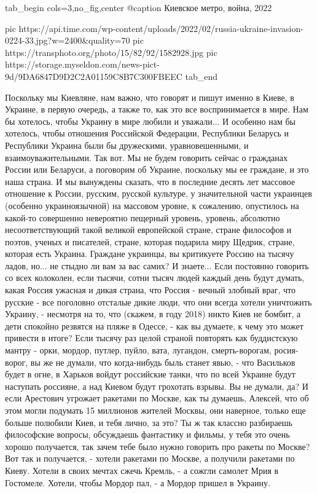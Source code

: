 \ifcmt
  tab_begin cols=3,no_fig,center
		 @caption Киевское метро, война, 2022

		 pic https://api.time.com/wp-content/uploads/2022/02/russia-ukraine-invasion-0224-33.jpg?w=2400&quality=70
		 pic https://transphoto.org/photo/15/82/92/1582928.jpg
		 pic https://storage.myseldon.com/news-pict-9d/9DA6847D9D2C2A01159C8B7C300FBEEC
  tab_end
\fi

Поскольку мы Киевляне, нам важно, что говорят и пишут именно в Киеве, в
Украине, в первую очередь, а также то, как это все воспринимается в мире. Нам
бы хотелось, чтобы Украину в мире любили и уважали... И особенно нам бы
хотелось, чтобы отношения Российской Федерации, Республики Беларусь и
Республики Украина были бы дружескими, уравновешенными, и взаимоуважительными.
Так вот. Мы не будем говорить сейчас о гражданах России или Беларуси, а
поговорим об Украине, поскольку мы ее граждане, и это наша страна. И мы вынуждены сказать, что в
последние десять лет массовое отношение к России, русским, русской культуре, у
значительной части украинцев (особенно украиноязычной) на массовом уровне, к
сожалению, опустилось на какой-то совершенно невероятно пещерный уровень, уровень,
абсолютно несоответствующий такой великой европейской стране, стране философов
и поэтов, ученых и писателей, стране, которая подарила миру Щедрик, стране,
которая есть Украина. Граждане украинцы, вы критикуете Россию на тысячу ладов,
но... не стыдно ли вам за вас самих? И знаете...  Если постоянно говорить со
всех колоколен, если тысячи, сотни тысяч людей каждый день будут думать, какая
Россия ужасная и дикая страна, что Россия - вечный злобный враг, что русские -
все поголовно отсталые дикие люди, что они всегда хотели уничтожить Украину, -
несмотря на то, что (скажем, в году 2018) никто Киев не бомбит, а дети спокойно
резвятся на пляже в Одессе, - как вы думаете, к чему это может привести в
итоге? Если тысячу раз целой страной повторять как буддистскую мантру - орки,
мордор, путлер, пуйло, вата, лугандон, смерть-ворогам, росия-ворог, вы же не
думали, что когда-нибудь быль станет явью, - что Васильков будет в огне, в
Харьков войдут российские танки, что по всей Украине будут наступать россияне,
а над Киевом будут грохотать взрывы. Вы не думали, да? И если Арестович
угрожает ракетами по Москве, как ты думаешь, Алексей, что об этом могли
подумать 15 миллионов жителей Москвы, они наверное, только еще больше полюбили
Киев, и тебя лично, за это? Ты ж так классно разбираешь философские вопросы,
обсуждаешь фантастику и фильмы, у тебя это очень хорошо получается, так зачем
тебе было нужно говорить про ракеты по Москве? Вот так и получается, - хотели
ракетами по Москве, а получили ракетами по Киеву. Хотели в своих мечтах сжечь
Кремль, - а сожгли самолет Мрия в Гостомеле.  Хотели, чтобы Мордор пал, - а
Мордор пришел в
Украину.

